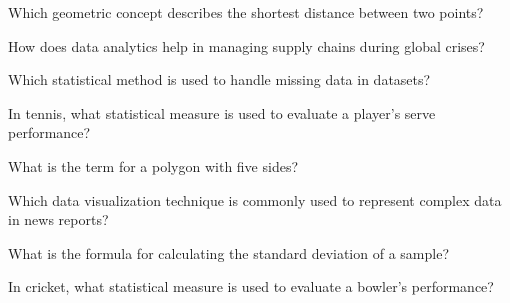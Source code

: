 \begin{enhancedmcq}{Which geometric concept describes the shortest distance between two points?}
\end{enhancedmcq}

\begin{enhancedmcq}{How does data analytics help in managing supply chains during global crises?}
\end{enhancedmcq}

\begin{enhancedmcq}{Which statistical method is used to handle missing data in datasets?}
\end{enhancedmcq}

\begin{enhancedmcq}{In tennis, what statistical measure is used to evaluate a player's serve performance?}
\end{enhancedmcq}

\begin{enhancedmcq}{What is the term for a polygon with five sides?}
\end{enhancedmcq}

\begin{enhancedmcq}{Which data visualization technique is commonly used to represent complex data in news reports?}
\end{enhancedmcq}

\begin{enhancedmcq}{What is the formula for calculating the standard deviation of a sample?}
\end{enhancedmcq}

\begin{enhancedmcq}{In cricket, what statistical measure is used to evaluate a bowler's performance?}
\end{enhancedmcq}

